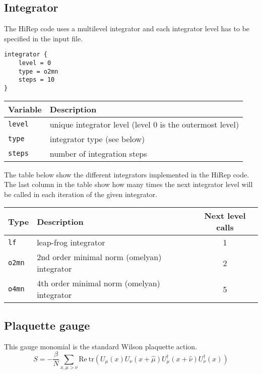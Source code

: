 \documentclass[12pt]{article}
\begin{document}
\subsection*{Integrator}
The HiRep code uses a multilevel integrator and each integrator level has to be specified in the input file.
\begin{center}
\begin{minipage}{40mm}
\begin{framed}
\begin{verbatim}
integrator {
    level = 0
    type = o2mn
    steps = 10
}
\end{verbatim}
\vspace{-5mm}
\end{framed}
\end{minipage}
\end{center}

\vspace{2mm}

\begin{center}
\begin{tabular}{l|l}
 Variable & Description \\
 \hline
 \verb|level| & unique integrator level (level 0 is the outermost level) \\
 \verb|type|  & integrator type (see below) \\
 \verb|steps| & number of integration steps \\
\end{tabular}
\end{center}

The table below show the different integrators implemented in the HiRep code. The last column in the table show how many times the next integrator level will be called in each iteration of the given integrator.

\begin{center}
\begin{tabular}{l|lc}
 Type & Description & Next level calls \\
 \hline
 \verb|lf|   & leap-frog integrator & 1\\
 \verb|o2mn| & 2nd order minimal norm (omelyan) integrator & 2 \\
 \verb|o4mn| & 4th order minimal norm (omelyan) integrator & 5\\
\end{tabular}
\end{center}

\newpage
\subsection*{Plaquette gauge}
This gauge monomial is the standard Wilson plaquette action.
\begin{equation}
 S = -\frac{\beta}{N}\sum_{x,\mu>\nu} \textrm{Re}~\textrm{tr}(U_\mu(x)U_\nu(x+\hat{\mu})U_\mu^\dagger(x+\hat{\nu})U_\nu^\dagger(x))
\end{equation}
\end{document}

